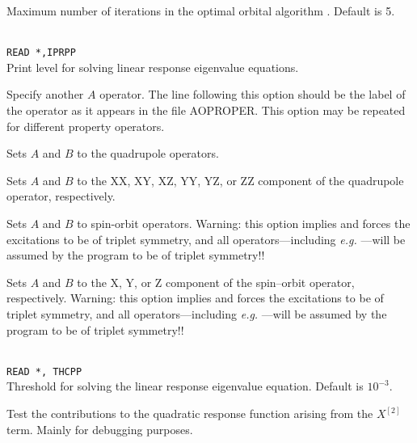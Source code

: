 \begin{description}
\item{}
Maximum number of iterations in the optimal
orbital algorithm
\cite{tuhjahjajpjjcp84}.
Default is 5.

\item{}\\
\verb|READ *,IPRPP|\\
Print level for solving linear response eigenvalue equations.

\item[\Key{PROPRT}]
Specify another $A$ operator. The line following this
option should be the label of the operator as it appears in the file
AOPROPER. This option may be repeated for different property operators.

\item{}
Sets $A$ and $B$ to the quadrupole operators.

\item{}
Sets $A$ and $B$ to the XX, XY, XZ, YY, YZ, or ZZ component of the
quadrupole operator, respectively.


\item{}
Sets $A$ and $B$ to spin-orbit operators.
Warning: this option implies  and
forces the excitations to be of triplet symmetry,
and all operators---including
{\it e.g.\/} ---will be assumed by the program to be of triplet symmetry!!

\item{}
Sets $A$ and $B$ to the X, Y, or Z component of the spin--orbit
operator, respectively.
Warning: this option implies  and
forces the excitations to be of triplet symmetry,
and all operators---including
{\it e.g.\/} ---will be assumed by the program to be of triplet symmetry!!

\item{}\\
\verb|READ *, THCPP|\\
Threshold for solving the linear response
eigenvalue equation. Default is $10^{-3}$.

\item{}
Test the contributions to the quadratic response function arising from
the $X^{\left[2\right]}$ term. Mainly for debugging purposes.
\end{description}


